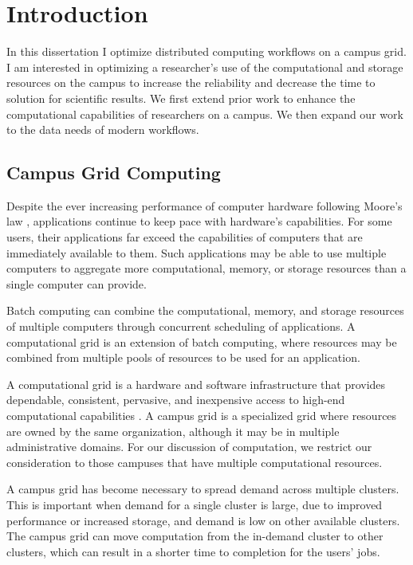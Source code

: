 \chapter{Introduction}

In this dissertation I optimize distributed computing workflows on a campus grid.  I am interested in optimizing a researcher's use of the computational and storage resources on the campus to increase the reliability and decrease the time to solution for scientific results.  We first extend prior work to enhance the computational capabilities of researchers on a campus.  We then expand our work to the data needs of modern workflows.

\section{Campus Grid Computing}

Despite the ever increasing performance of computer hardware following Moore's law \cite{schaller1997moore}, applications continue to keep pace with hardware's capabilities.  For some users, their applications far exceed the capabilities of computers that are immediately available to them.  Such applications may be able to use multiple computers to aggregate  more computational, memory, or storage resources than a single computer can \mbox{provide}.

Batch computing can combine the computational, memory, and storage resources of multiple computers through concurrent scheduling of applications.  A computational grid is an extension of batch computing, where resources may be combined from multiple pools of resources to be used for an application.

A computational grid is a hardware and software infrastructure that provides dependable, consistent, pervasive, and inexpensive access to high-end computational capabilities \cite{foster2004grid}.  A campus grid is a specialized grid where resources are owned by the same organization, although it may be in multiple administrative domains.  For our discussion of computation, we restrict our consideration to those campuses that have multiple computational resources.

A campus grid has become necessary to spread demand across multiple clusters.  This is important when demand for a single cluster is large, due to improved performance or increased storage, and demand is low on other available clusters.  The campus grid can move computation from the in-demand cluster to other clusters, which can result in a shorter time to completion for the users' jobs.

